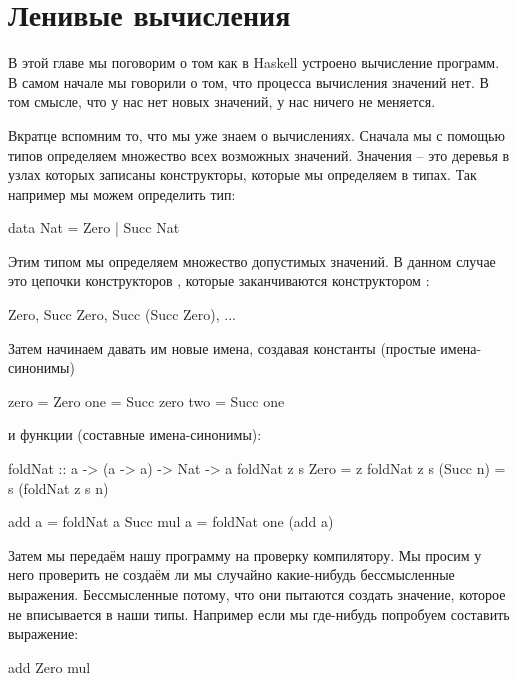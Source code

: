 \setcounter{chapter}{7}
\chapter{Ленивые вычисления}

В этой главе мы поговорим о том как в Haskell устроено вычисление
программ. В самом начале мы говорили о том, что 
процесса вычисления значений нет. В том смысле, что у нас
нет новых значений, у нас ничего не меняется. 

Вкратце вспомним то, что мы уже знаем о вычислениях.
Сначала мы с помощью типов определяем
множество всех возможных значений. Значения -- это деревья
в узлах которых записаны конструкторы, которые мы 
определяем в типах. Так например мы можем определить тип:

\begin{code}
data Nat = Zero | Succ Nat
\end{code}

Этим типом мы определяем множество допустимых значений. 
В данном случае это цепочки конструкторов ,
которые заканчиваются конструктором :

\begin{code}
Zero, Succ Zero, Succ (Succ Zero), ...
\end{code}
    
Затем начинаем давать им
новые имена, создавая константы (простые имена-синонимы) 
  
\begin{code}
zero    = Zero
one     = Succ zero
two     = Succ one
\end{code}


\noindent и функции (составные имена-синонимы):

\begin{code}
foldNat     :: a -> (a -> a) -> Nat -> a
foldNat z  s  Zero      = z
foldNat z  s  (Succ n)  = s (foldNat z s n)

add a = foldNat a   Succ
mul a = foldNat one (add a) 
\end{code}

Затем мы передаём нашу программу на проверку компилятору. 
Мы просим у него проверить не создаём ли мы случайно 
какие-нибудь бессмысленные
выражения. Бессмысленные потому, что они пытаются 
создать значение, которое не вписывается в наши типы.
Например если мы где-нибудь попробуем составить выражение:

\begin{code}
add Zero mul
\end{code}

